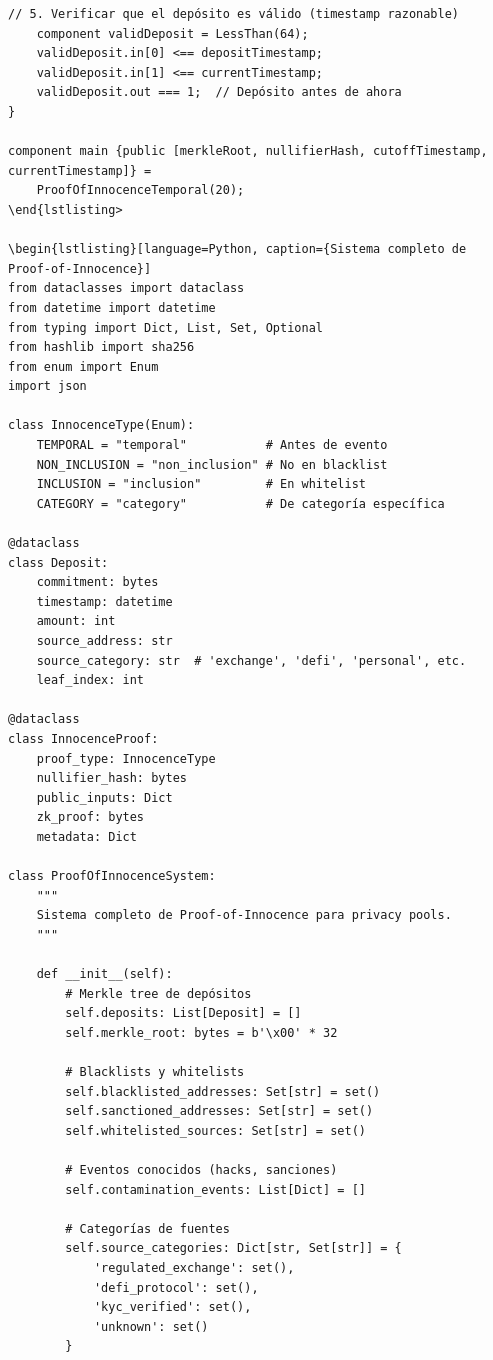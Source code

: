\documentclass[11pt,a4paper,twoside]{book}
\theoremstyle{definition}
\theoremstyle{remark}
\begin{document}
\begin{lstlisting}[language=circom, caption={Circuito de Proof-of-Innocence temporal}]
    // 5. Verificar que el depósito es válido (timestamp razonable)
    component validDeposit = LessThan(64);
    validDeposit.in[0] <== depositTimestamp;
    validDeposit.in[1] <== currentTimestamp;
    validDeposit.out === 1;  // Depósito antes de ahora
}

component main {public [merkleRoot, nullifierHash, cutoffTimestamp, currentTimestamp]} = 
    ProofOfInnocenceTemporal(20);
\end{lstlisting>

\begin{lstlisting}[language=Python, caption={Sistema completo de Proof-of-Innocence}]
from dataclasses import dataclass
from datetime import datetime
from typing import Dict, List, Set, Optional
from hashlib import sha256
from enum import Enum
import json

class InnocenceType(Enum):
    TEMPORAL = "temporal"           # Antes de evento
    NON_INCLUSION = "non_inclusion" # No en blacklist
    INCLUSION = "inclusion"         # En whitelist
    CATEGORY = "category"           # De categoría específica

@dataclass
class Deposit:
    commitment: bytes
    timestamp: datetime
    amount: int
    source_address: str
    source_category: str  # 'exchange', 'defi', 'personal', etc.
    leaf_index: int

@dataclass
class InnocenceProof:
    proof_type: InnocenceType
    nullifier_hash: bytes
    public_inputs: Dict
    zk_proof: bytes
    metadata: Dict

class ProofOfInnocenceSystem:
    """
    Sistema completo de Proof-of-Innocence para privacy pools.
    """
    
    def __init__(self):
        # Merkle tree de depósitos
        self.deposits: List[Deposit] = []
        self.merkle_root: bytes = b'\x00' * 32
        
        # Blacklists y whitelists
        self.blacklisted_addresses: Set[str] = set()
        self.sanctioned_addresses: Set[str] = set()
        self.whitelisted_sources: Set[str] = set()
        
        # Eventos conocidos (hacks, sanciones)
        self.contamination_events: List[Dict] = []
        
        # Categorías de fuentes
        self.source_categories: Dict[str, Set[str]] = {
            'regulated_exchange': set(),
            'defi_protocol': set(),
            'kyc_verified': set(),
            'unknown': set()
        }
    

\end{lstlisting}
\end{document}

